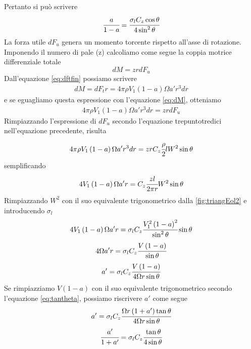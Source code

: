 Pertanto si può scrivere
\begin{equation}\label{eq:asolid}
\cfrac{a}{1-a} = \cfrac{\sigma_l C_z \cos \theta}{4 \sin^2 \theta}
\end{equation}
La forza utile $dF_u$ genera un momento torcente rispetto all'asse di rotazione. Imponendo il numero di pale (z) calcoliamo come segue la coppia motrice differenziale totale
\begin{equation}\label{eq:dM}
dM = z r dF_u
\end{equation}
Dall'equazione \ref{eq:dftfin} possiamo scrivere
\begin{align*}
dM = dF_t r = 4 \pi \rho V_1 \left( 1- a \right) \Omega a' r^3 dr
\end{align*}
e se eguagliamo questa espressione con l'equazione \ref{eq:dM}, otteniamo
\begin{align*}
4 \pi \rho V_1 \left(1-a \right) \Omega a' r^3 dr = z r dF_u
\end{align*}
Rimpiazzando l'espressione di $dF_u$ secondo l'equazione trepuntotredici nell'equazione precedente, risulta
\begin{align*}
4 \pi \rho V_1 \left(1-a \right) \Omega a' r^3 dr = z r C_z \cfrac{\rho}{2} l W^2 \sin \theta
\end{align*}
semplificando
\begin{align*}
4 V_1 \left(1-a \right) \Omega a' r = C_z \cfrac{z l }{2 \pi r} W^2 \sin \theta
\end{align*}
Rimpiazzando $W^2$ con il suo equivalente trigonometrico dalla \ref{fig:triangEol2} e introducendo $\sigma_l$
\begin{align*}
4 V_1 \left(1-a \right) \Omega a' r = \sigma_l C_z \cfrac{V_1^2 \left(1-a \right)^2}{\sin^2 \theta} \sin \theta
\end{align*}
\begin{align*}
4 \Omega a' r = \sigma_l C_z \cfrac{V \left(1-a \right)}{\sin \theta}
\end{align*}
\begin{align*}
a'= \sigma_l C_z \cfrac{V \left(1-a \right)}{4 \Omega r \sin \theta}
\end{align*}
Se rimpiazziamo $V \left(1-a\right)$ con il suo equivalente trigonometrico secondo l'equazione \ref{eq:tantheta}, possiamo riscrivere $a'$ come segue
\begin{align*}
a' = \sigma_l C_z \cfrac{\Omega r \left(1+a' \right) \tan \theta}{4 \Omega r \sin \theta}
\end{align*}
\begin{align*}
\cfrac{a'}{1+a'} = \sigma_l C_z \cfrac{\tan \theta}{4 \sin \theta}
\end{align*}
